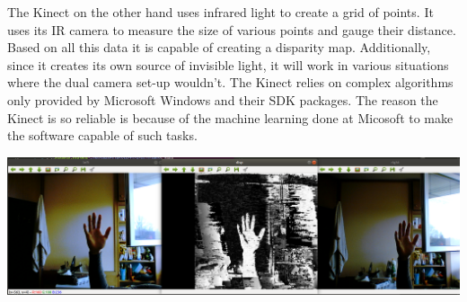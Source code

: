 \documentclass{article}
\begin{document}
The Kinect on the other hand uses infrared light to create a grid of points. It uses its IR camera to measure the size of various points and gauge their distance. Based on all this data it is capable of creating a disparity map. Additionally, since it creates its own source of invisible light, it will work in various situations where the dual camera set-up wouldn't. The Kinect relies on complex algorithms only provided by Microsoft Windows and their SDK packages. The reason the Kinect is so reliable is because of the machine learning done at Micosoft to make the software capable of such tasks.

\begin{center}
\includegraphics[width=\textwidth]{IMG/DualCam_Disp.PNG}
\end{center}
\end{document}
